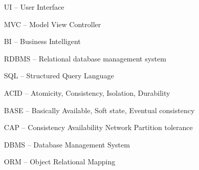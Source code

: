 \begin{itemize}[leftmargin=2cm, topsep=0pt, partopsep=5pt,itemsep=0pt,parsep=0pt]
\item[UI --] User Interface
\item[MVC --] Model View Controller
\item[BI --] Business Intelligent
\item[RDBMS --] Relational database management system
\item[SQL --] Structured Query Language
\item[ACID --] Atomicity, Consistency, Isolation, Durability
\item[BASE --] Basically Available, Soft state, Eventual consistency
\item[CAP --] Consistency Availability Network Partition tolerance
\item[DBMS --] Database Management System
\item[ORM --] Object Relational Mapping
\end{itemize}